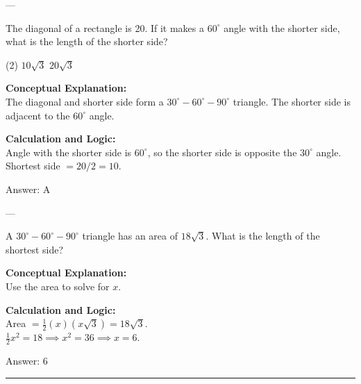 \documentclass[11pt,paper=a4,answers]{exam}
\begin{document}
\begin{questions}
---

\question
The diagonal of a rectangle is 20. If it makes a $60^\circ$ angle with the shorter side, what is the length of the shorter side?
\begin{tasks}(2)
    \task $10\sqrt{3}$
    \task $20\sqrt{3}$
\end{tasks}

\begin{solution}
\textbf{Conceptual Explanation:} \\
The diagonal and shorter side form a $30^\circ-60^\circ-90^\circ$ triangle. The shorter side is adjacent to the $60^\circ$ angle.

\vspace{10pt}
\textbf{Calculation and Logic:} \\
Angle with the shorter side is $60^\circ$, so the shorter side is opposite the $30^\circ$ angle. \\
Shortest side $= 20 / 2 = 10$.

\vspace{15pt}
Answer: \colorbox{yellow!100}{A}
\end{solution}

---

\question
A $30^\circ-60^\circ-90^\circ$ triangle has an area of $18\sqrt{3}$. What is the length of the shortest side?

\begin{solution}
\textbf{Conceptual Explanation:} \\
Use the area to solve for $x$.

\vspace{10pt}
\textbf{Calculation and Logic:} \\
Area $= \frac{1}{2}(x)(x\sqrt{3}) = 18\sqrt{3}$. \\
$\frac{1}{2}x^2 = 18 \implies x^2 = 36 \implies x = 6$.

\vspace{15pt}
Answer: \colorbox{yellow!100}{6}
\end{solution}


\end{questions}
\begin{center}
\rule{.5\textwidth}{1pt}
\end{center}
\end{document}
